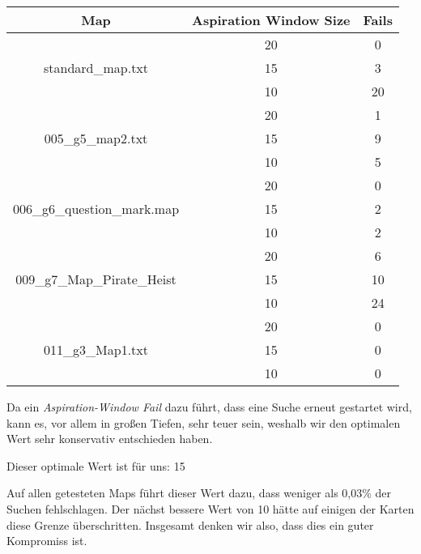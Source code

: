 \begin{tabular}{|c|c|c|}
\hline 
Map & Aspiration Window Size & Fails \\ 
\hline 
\hline
\multirow{3}{*}{standard\_map.txt} & 20 & 0  \\
                                   & 15 & 3  \\ 
                                   & 10 & 20 \\ 
\hline 

\multirow{3}{*}{005\_g5\_map2.txt} & 20 & 1 \\ 
                                   & 15 & 9 \\ 
                                   & 10 & 5 \\ 
\hline 

\multirow{3}{*}{006\_g6\_question\_mark.map} & 20 & 0 \\
                                             & 15 & 2 \\ 
                                             & 10 & 2 \\ 
\hline 

\multirow{3}{*}{009\_g7\_Map\_Pirate\_Heist} & 20 & 6 \\
                                             & 15 & 10 \\ 
                                             & 10 & 24 \\ 
\hline 
 
\multirow{3}{*}{011\_g3\_Map1.txt} & 20 & 0 \\
                                   & 15 & 0 \\ 
                                   & 10 & 0 \\ 
\hline 
\end{tabular} 

Da ein \textit{Aspiration-Window Fail} dazu führt, dass eine Suche erneut gestartet wird, kann es, vor allem in großen Tiefen, sehr teuer sein, weshalb wir den optimalen Wert sehr konservativ entschieden haben. 

Dieser optimale Wert ist für uns: 15

Auf allen getesteten Maps führt dieser Wert dazu, dass weniger als 0,03\% der Suchen fehlschlagen. Der nächst bessere Wert von 10 hätte auf einigen der Karten diese Grenze überschritten. Insgesamt denken wir also, dass dies ein guter Kompromiss ist.